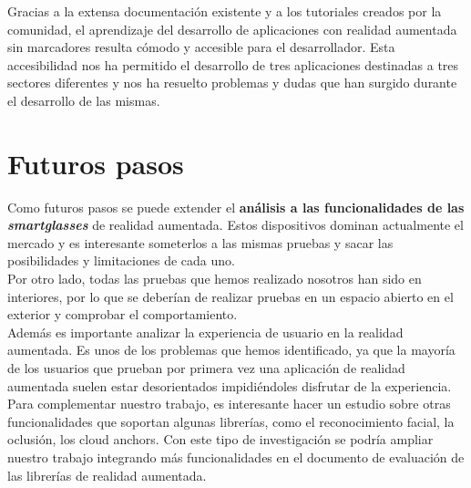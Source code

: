 Gracias a la extensa documentación existente y a los tutoriales creados por la comunidad, el aprendizaje del desarrollo de aplicaciones con realidad aumentada sin marcadores resulta cómodo y accesible para el desarrollador. Esta accesibilidad nos ha permitido el desarrollo de tres aplicaciones destinadas a tres sectores diferentes y nos ha resuelto problemas y dudas que han surgido durante el desarrollo de las mismas.


\section{Futuros pasos}

Como futuros pasos se puede extender el \textbf{análisis a las funcionalidades de las \textit{smartglasses}} de realidad aumentada. Estos dispositivos dominan actualmente el mercado y es interesante someterlos a las mismas pruebas y sacar las posibilidades y limitaciones de cada uno. \\

Por otro lado, todas las pruebas que hemos realizado nosotros han sido en interiores, por lo que se deberían de realizar pruebas en un espacio abierto en el exterior y comprobar el comportamiento.\\

Además es importante analizar la experiencia de usuario en la realidad aumentada. Es unos de los problemas que hemos identificado, ya que la mayoría de los usuarios que prueban por primera vez una aplicación de realidad aumentada suelen estar desorientados impidiéndoles disfrutar de la experiencia.\\

Para complementar nuestro trabajo, es interesante hacer un estudio sobre otras funcionalidades que soportan algunas librerías, como el reconocimiento facial, la oclusión, los cloud anchors. Con este tipo de investigación se podría ampliar nuestro trabajo integrando más funcionalidades en el documento de evaluación de las librerías de realidad aumentada.

\noindent 
